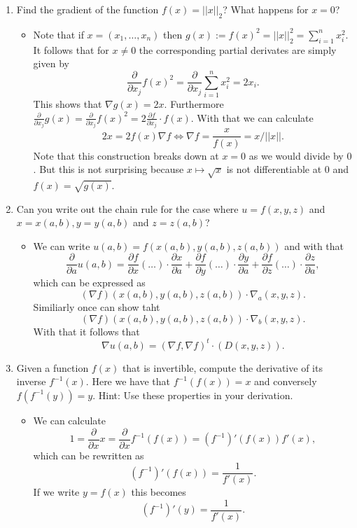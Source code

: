 \documentclass{article}
\begin{document}
\begin{enumerate}
\begin{itemize}
\begin{center}
    \end{center}
	\end{itemize}
\item Find the gradient of the function $f(x) = ||x||_2$? What happens for $x = 0$?
	\begin{itemize}
	\item Note that if $x = (x_1, \dots, x_n)$ then $g(x) := f(x)^2 = ||x||_2^2 = \sum_{i = 1}^n x_i^2$. It follows that for $x \neq 0$ the corresponding partial derivates are simply given by
	$$
	\frac{\partial}{\partial x_j} f(x)^2 = \frac{\partial}{\partial x_j} \sum_{i = 1}^n x_i^2 = 2 x_i.
	$$
	This shows that $\nabla g(x) = 2 x$. Furthermore $\frac{\partial}{\partial x_j} g(x) = \frac{\partial}{\partial x_j} f(x)^2 = 2 \frac{\partial f}{\partial x_j} \cdot f(x)$. With that we can calculate
	$$
	2x = 2 f(x) \nabla f \iff \nabla f = \frac{x}{f(x)} = x / ||x||.
	$$
	Note that this construction breaks down at $x = 0$ as we would divide by $0$. But this is not surprising because $x \mapsto \sqrt{x}$ is not differentiable at $0$ and $f(x) = \sqrt{g(x)}$.
	\end{itemize}
\item Can you write out the chain rule for the case where $u = f(x, y, z)$ and $x = x(a, b), y = y(a, b)$ and $z = z(a, b)$?
	\begin{itemize}
	\item We can write $u(a, b) = f(x(a, b), y(a, b), z(a, b))$ and with that
	$$
	\frac{\partial}{\partial a} u(a, b) = \frac{\partial f}{\partial x}(\dots) \cdot \frac{\partial x}{\partial a} + \frac{\partial f}{\partial y}(\dots) \cdot \frac{\partial y}{\partial a} + \frac{\partial f}{\partial z}(\dots) \cdot \frac{\partial z}{\partial a},
	$$
	which can be expressed as
	$$
	(\nabla f)(x(a, b), y(a, b), z(a, b)) \cdot \nabla_a (x, y, z).
	$$
	Similiarly once can show taht
	$$
	(\nabla f)(x(a, b), y(a, b), z(a, b)) \cdot \nabla_b (x, y, z).
	$$
	With that it follows that
	$$
	\nabla u(a, b) = (\nabla f, \nabla f)^t \cdot (D(x, y, z)).
	$$
	\end{itemize}
\item Given a function $f(x)$ that is invertible, compute the derivative of its inverse $f^{-1}(x)$. Here we have that $f^{-1}(f(x)) = x$ and conversely $f(f^{-1}(y)) = y$. Hint: Use these properties in your derivation.
	\begin{itemize}
		\item We can calculate
		$$
		1 = \frac{\partial}{\partial x} x = \frac{\partial}{\partial x} f^{-1}(f(x)) = (f^{-1})'(f(x)) f'(x),
		$$
		which can be rewritten as
		$$
		(f^{-1})'(f(x)) = \frac{1}{f'(x)}.
		$$
		If we write $y = f(x)$ this becomes
		$$
		(f^{-1})'(y) = \frac{1}{f'(x)}.
		$$
	\end{itemize}
\end{enumerate}
\end{document}
